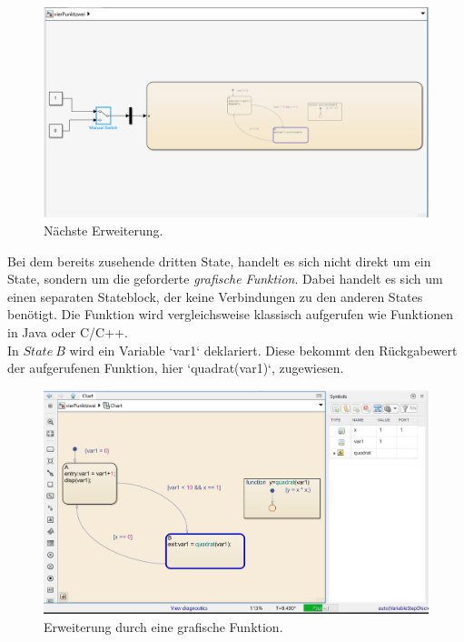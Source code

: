 \documentclass{article}
\begin{document}
		\subsection{}
			\begin{figure}[h]
				\centering
				\includegraphics[scale=0.7]{Aufgabe4.3e.png}
				\caption{Nächste Erweiterung.}
				\label{fig_11: Aufg_3e}
			\end{figure}
			Bei dem bereits zusehende dritten State, handelt es sich nicht direkt um ein State, sondern um die geforderte \textit{grafische Funktion}. Dabei handelt es sich um einen separaten Stateblock, der keine Verbindungen zu den anderen States benötigt. Die Funktion wird vergleichsweise klassisch aufgerufen wie Funktionen in Java oder C/C++. \\
			In $State\ B$ wird ein Variable `var1` deklariert. Diese bekommt den Rückgabewert der aufgerufenen Funktion, hier `quadrat(var1)`, zugewiesen.
			\begin{figure}[h]
				\centering
				\includegraphics[scale=0.6]{Aufgabe4.3eChart.png}
				\caption{Erweiterung durch eine grafische Funktion.}
				\label{fig_12: Aufg_3e_Chart}
			\end{figure}
\clearpage
\newpage
\end{document}
